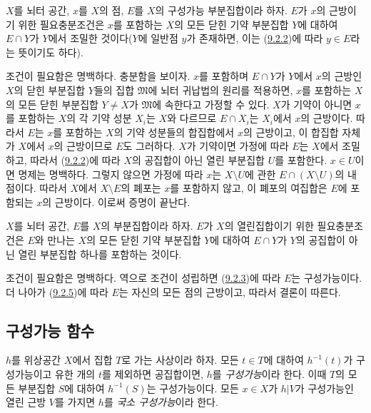 \begin{proposition}[9.2.5]
\label{0.9.2.5-ko}
$X$를 뇌터 공간, $x$를 $X$의 점, $E$를 $X$의 구성가능 부분집합이라
하자. $E$가 $x$의 근방이기 위한 필요충분조건은 $x$를 포함하는 $X$의
모든 닫힌 기약 부분집합 $Y$에 대하여 $E\cap Y$가 $Y$에서 조밀한
것이다($Y$에 일반점 $y$가 존재하면, 이는
(\hyperref[0.9.2.2-ko]{9.2.2})에 따라 $y\in E$라는 뜻이기도 하다).
\end{proposition}

조건이 필요함은 명백하다. 충분함을 보이자. $x$를 포함하며 $E\cap Y$가
$Y$에서 $x$의 근방인 $X$의 닫힌 부분집합 $Y$들의 집합
$\mathfrak{M}$에 뇌터 귀납법의 원리를 적용하면, $x$를 포함하는
$X$의 모든 닫힌 부분집합 $Y\ne X$가 $\mathfrak{M}$에 속한다고 가정할
수 있다. $X$가 기약이 아니면 $x$를 포함하는 $X$의 각 기약 성분
$X_i$는 $X$와 다르므로 $E\cap X_i$는 $X_i$에서 $x$의 근방이다.
따라서 $E$는 $x$를 포함하는 $X$의 기약 성분들의 합집합에서 $x$의
근방이고, 이 합집합 자체가 $X$에서 $x$의 근방이므로 $E$도 그러하다.
$X$가 기약이면 가정에 따라 $E$는 $X$에서 조밀하고, 따라서
(\hyperref[0.9.2.2-ko]{9.2.2})에 따라 $X$의 공집합이 아닌 열린
부분집합 $U$를 포함한다. $x\in U$이면 명제는 명백하다. 그렇지 않으면
가정에 따라 $x$는 $X\setminus U$에 관한 $E\cap(X\setminus U)$의
내점이다. 따라서 $X$에서 $X\setminus E$의 폐포는 $x$를 포함하지 않고,
이 폐포의 여집합은 $E$에 포함되는 $x$의 근방이다. 이로써 증명이
끝난다.

\begin{corollary}[9.2.6]
\label{0.9.2.6-ko}
$X$를 뇌터 공간, $E$를 $X$의 부분집합이라 하자. $E$가 $X$의
열린집합이기 위한 필요충분조건은 $E$와 만나는 $X$의 모든 닫힌 기약
부분집합 $Y$에 대하여 $E\cap Y$가 $Y$의 공집합이 아닌 열린 부분집합
하나를 포함하는 것이다.
\end{corollary}

조건이 필요함은 명백하다. 역으로 조건이 성립하면
(\hyperref[0.9.2.3-ko]{9.2.3})에 따라 $E$는 구성가능이다. 더 나아가
(\hyperref[0.9.2.5-ko]{9.2.5})에 따라 $E$는 자신의 모든 점의 근방이고,
따라서 결론이 따른다.

\subsection{구성가능 함수}
\label{subsection:0.9.3-ko}

\begin{definition}[9.3.1]
\label{0.9.3.1-ko}
$h$를 위상공간 $X$에서 집합 $T$로 가는 사상이라 하자. 모든 $t\in T$에
대하여 $h^{-1}(t)$가 구성가능이고 유한 개의 $t$를 제외하면 공집합이면,
$h$를 \emph{구성가능}이라 한다. 이때 $T$의 모든 부분집합 $S$에 대하여
$h^{-1}(S)$는 구성가능이다. 모든 $x\in X$가 $h|V$가 구성가능인 열린
근방 $V$를 가지면 $h$를 \emph{국소 구성가능}이라 한다.
\end{definition}

